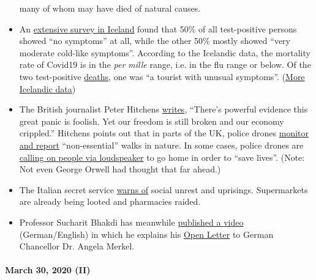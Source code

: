 \begin{itemize}
  many of whom may have died of natural causes.
\item
  An
  \href{https://www.buzzfeed.com/albertonardelli/coronavirus-testing-iceland}{extensive
  survey in Iceland} found that 50\% of all test-positive persons showed
  ``no symptoms'' at all, while the other 50\% mostly showed ``very
  moderate cold-like symptoms''. According to the Icelandic data, the
  mortality rate of Covid19 is in the \emph{per mille} range, i.e. in
  the flu range or below. Of the two test-positive
  \href{https://www.government.is/news/article/?newsid=c65cf658-6eb6-11ea-9462-005056bc4d74}{deaths},
  one was ``a tourist with unusual symptoms''.
  (\href{https://www.covid.is/data}{More Icelandic data})
\item
  The British journalist Peter Hitchens
  \href{https://hitchensblog.mailonsunday.co.uk/2020/03/theres-powerful-evidence-this-great-panic-is-foolish-yet-our-freedom-is-still-broken-and-our-economy.html}{writes},
  ``There's powerful evidence this great panic is foolish. Yet our
  freedom is still broken and our economy crippled.'' Hitchens points
  out that in parts of the UK, police drones
  \href{https://www.youtube.com/watch?v=fHNxDzLsPeg}{monitor and report}
  ``non-essential'' walks in nature. In some cases, police drones are
  \href{https://www.youtube.com/watch?v=D4GEZjUTkqc}{calling on people
  via loudspeaker} to go home in order to ``save lives''. (Note: Not
  even George Orwell had thought that far ahead.)
\item
  The Italian secret service
  \href{https://www.focus.de/panorama/welt/sorge-vor-sozialen-unruhen-supermaerkte-gepluendert-apotheken-ueberfallen-italiens-geheimdienst-warnt-vor-aufstaenden_id_11826664.html}{warns
  of} social unrest and uprisings. Supermarkets are already being looted
  and pharmacies raided.
\item
  Professor Sucharit Bhakdi has meanwhile
  \href{https://www.youtube.com/watch?v=LsExPrHCHbw\&feature=emb_title}{published
  a video} (German/English) in which he explains his
  \href{https://swprs.org/open-letter-from-professor-sucharit-bhakdi-to-german-chancellor-dr-angela-merkel/}{Open
  Letter} to German Chancellor Dr. Angela Merkel.
\end{itemize}

\hypertarget{march-30-2020-ii}{%
\paragraph{March 30, 2020 (II)}\label{march-30-2020-ii}}

